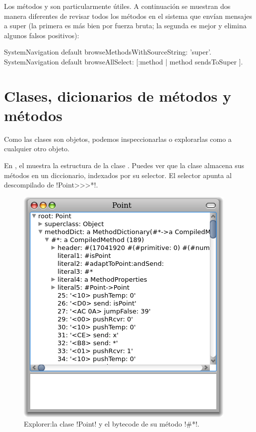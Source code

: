 \documentclass[a4paper,10pt,twoside]{book}
\begin{document}
Los m\'etodos  y
 son particularmente \'utiles.  A
continuaci\'on se muestran dos manera diferentes de revisar todos los
m\'etodos en el sistema que env\'ian mensajes a super (la primera es m\'as
bien por fuerza bruta; la segunda es mejor y elimina algunos falsos
positivos):
\begin{code}{}
SystemNavigation default browseMethodsWithSourceString: 'super'.
SystemNavigation default browseAllSelect: [:method | method sendsToSuper ].
\end{code}

\section{Clases, dicionarios de m\'etodos y m\'etodos}

Como las clases son objetos, podemos inspeccionarlas o explorarlas
como a cualquier otro objeto.


En , el  muestra la estructura de
la clase .  Puedes ver que la clase almacena sus m\'etodos
en un diccionario, indexados por su selector.  El selector \ct{#*}
apunta al  descompilado de \ct!Point>>>*!.

\begin{figure}[ht]\centering
        \includegraphics[width=.5\linewidth]{CompiledMethod}
        \caption{Explorer:la clase \ct!Point! y el bytecode de su m\'etodo \ct!\#*!.}
\end{figure}
\end{document}

